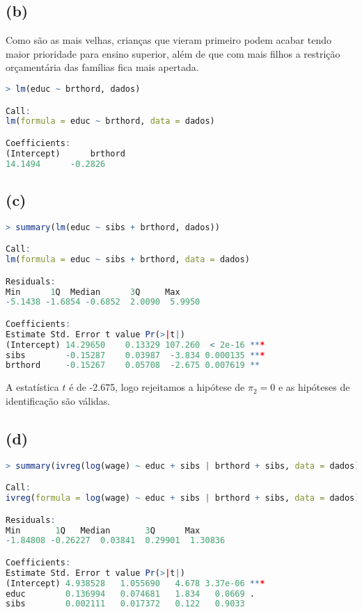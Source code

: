 \documentclass[12pt]{article}
\begin{document}
\subsection*{(b)}
Como são as mais velhas, crianças que vieram primeiro podem acabar tendo maior prioridade para ensino superior, além de que com mais filhos a restrição orçamentária das famílias fica mais apertada.
\begin{lstlisting}[language=R]
> lm(educ ~ brthord, dados)

Call:
lm(formula = educ ~ brthord, data = dados)

Coefficients:
(Intercept)      brthord  
14.1494      -0.2826  
\end{lstlisting}

\subsection*{(c)}
\begin{lstlisting}[language=R]
> summary(lm(educ ~ sibs + brthord, dados))

Call:
lm(formula = educ ~ sibs + brthord, data = dados)

Residuals:
Min      1Q  Median      3Q     Max 
-5.1438 -1.6854 -0.6852  2.0090  5.9950 

Coefficients:
Estimate Std. Error t value Pr(>|t|)    
(Intercept) 14.29650    0.13329 107.260  < 2e-16 ***
sibs        -0.15287    0.03987  -3.834 0.000135 ***
brthord     -0.15267    0.05708  -2.675 0.007619 ** 
\end{lstlisting}
A estatística $t$ é de -2.675, logo rejeitamos a hipótese de $\pi_{2}=0$ e as hipóteses de identificação são válidas.

\subsection*{(d)}
\begin{lstlisting}[language=R]
> summary(ivreg(log(wage) ~ educ + sibs | brthord + sibs, data = dados))

Call:
ivreg(formula = log(wage) ~ educ + sibs | brthord + sibs, data = dados)

Residuals:
Min       1Q   Median       3Q      Max 
-1.84808 -0.26227  0.03841  0.29901  1.30836 

Coefficients:
Estimate Std. Error t value Pr(>|t|)    
(Intercept) 4.938528   1.055690   4.678 3.37e-06 ***
educ        0.136994   0.074681   1.834   0.0669 .  
sibs        0.002111   0.017372   0.122   0.9033  
\end{lstlisting}
\end{document}
